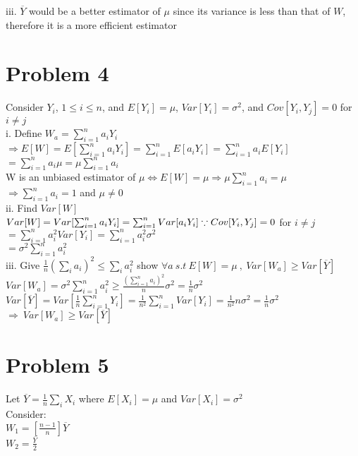 \documentclass[11pt, oneside]{article}   	%
\begin{document}
iii. $\overline{Y}$ would be a better estimator of $\mu$ since its variance is less than that of $W$, therefore it is a more efficient estimator\\

\section{Problem 4}
Consider $Y_i$, $1\leq i \leq n$, and $E[Y_i]=\mu$, $Var[Y_i]=\sigma^{2}$, and $Cov[Y_i,Y_j]=0$ for $i\neq j$\\

i. Define $W_a=\sum_{i=1}^{n} a_i Y_i$ \\
$\Rightarrow E[W]=E[\sum_{i=1}^{n} a_i Y_i]=\sum_{i=1}^{n}E[a_i Y_i]=\sum_{i=1}^{n}a_i E[Y_i]$\\
\indent$=\sum_{i=1}^{n}a_i \mu=\mu\sum_{i=1}^{n}a_i$\\
\indent W is an unbiased estimator of $\mu \iff E[W]=\mu\Rightarrow \mu\sum_{i=1}^{n}a_i=\mu$\\
\indent$\Rightarrow \sum_{i=1}^{n}a_i = 1$ and $\mu\neq 0$\\

ii. Find $Var[W]$\\
$Var[W]=Var[\sum_{i=1}^{n} a_i Y_i]=\sum_{i=1}^{n}Var[a_i Y_i]\hfill\because Cov[Y_i,Y_j]=0$ for $i\neq j$\\
\indent$=\sum_{i=1}^n a_i^2 Var[Y_i]=\sum_{i=1}^n a_i^2\sigma^2$\\
\indent$=\sigma^2 \sum_{i=1}^n a_i^2$\\

iii. Give $\frac{1}{n}(\sum_i a_i)^2 \leq \sum_i a_i^2$ show $\forall a\ s.t\ E[W]=\mu\ ,\ Var[W_a]\geq Var[\overline{Y}]\ \ $\\
\indent$Var[W_a]=\sigma^2 \sum_{i=1}^n a_i^2 \geq \frac{(\sum_{i=1}^{n}a_i)^2}{n}\sigma^2=\frac{1}{n}\sigma^2$\\
\indent$Var[\overline{Y}]=Var[\frac{1}{n}\sum_{i=1}^n Y_i] = \frac{1}{n^2} \sum_{i=1}^{n}Var[Y_i]=\frac{1}{n^2} n\sigma^2=\frac{1}{n}\sigma^2$\\
$\Rightarrow\ Var[W_a] \geq Var[\overline{Y}]$\\

\section{Problem 5}
Let $\overline{Y}=\frac{1}{n}\sum_i X_i$ where $E[X_i]=\mu$ and $Var[X_i]=\sigma^2$\\
Consider:\\
\indent$W_1=[\frac{n-1}{n}]\overline{Y}$\\
\indent$W_2=\frac{\overline{Y}}{2}$\\
\end{document}
